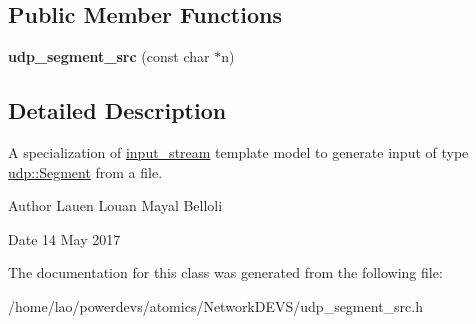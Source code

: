 \subsection*{Public Member Functions}
\begin{DoxyCompactItemize}
\item 
{\bfseries udp\+\_\+segment\+\_\+src} (const char $\ast$n)\hypertarget{classudp__segment__src_a22edeab46f4ea63b712b4236d773848a}{}\label{classudp__segment__src_a22edeab46f4ea63b712b4236d773848a}

\end{DoxyCompactItemize}


\subsection{Detailed Description}
A specialization of \hyperlink{classinput__stream}{input\+\_\+stream} template model to generate input of type \hyperlink{structudp_1_1Segment}{udp\+::\+Segment} from a file. 

\begin{DoxyAuthor}{Author}
Lauen Louan Mayal Belloli 
\end{DoxyAuthor}
\begin{DoxyDate}{Date}
14 May 2017 
\end{DoxyDate}


The documentation for this class was generated from the following file\+:\begin{DoxyCompactItemize}
\item 
/home/lao/powerdevs/atomics/\+Network\+D\+E\+V\+S/udp\+\_\+segment\+\_\+src.\+h\end{DoxyCompactItemize}
